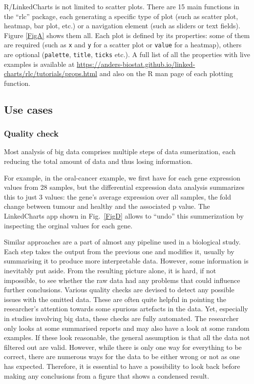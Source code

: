 \documentclass[twocolumn,10pt]{article}
\begin{document}
R/LinkedCharts is not limited to scatter plots. There are 15 main functions in the ``rlc'' package, each generating a specific type of plot (such as scatter plot, heatmap, bar plot, etc.) or a navigation element (such as sliders or text fields). Figure \ref{FigA} shows them all. Each plot is defined by its properties: some of them are required (such as \texttt{x} and \texttt{y} for a scatter plot or \texttt{value} for a heatmap), others are optional (\texttt{palette}, \texttt{title}, \texttt{ticks} etc.). A full list of all the properties with live examples is available at \url{https://anders-biostat.github.io/linked-charts/rlc/tutorials/props.html} and also on the R man page of each plotting function.

\subsection{Use cases}
\subsubsection{Quality check}

Most analysis of big data comprises multiple steps of data sumerization, each reducing the total amount of data and thus losing information.

For example, in the oral-cancer example, we first have for each gene expression values from 28 samples, but the differential expression data analysis summarizes this to just 3 values: the gene's average expression over all samples, the fold change between tumour and healthy and the associated p value. The LinkedCharts app shown in Fig.\ \ref{FigD} allows to ``undo'' this summerization by inspecting the orginal values for each gene.

Similar approaches are a part of almost any pipeline used in a biological study. Each step takes the output from the previous one and modifies it, usually by summarising it to produce more interpretable data. However, some information is inevitably put aside. From the resulting picture alone, it is hard, if not impossible, to see whether the raw data had any problems that could influence further conclusions. Various quality checks are devised to detect any possible issues with the omitted data. These are often quite helpful in pointing the researcher's attention towards some spurious artefacts in the data. Yet, especially in studies involving big data, these checks are fully automated. The researcher only looks at some summarised reports and may also have a look at some random examples. If these look reasonable, the general assumption is that all the data not filtered out are valid. However, while there is only one way for everything to be correct, there are numerous ways for the data to be either wrong or not as one has expected. Therefore, it is essential to have a possibility to look back before making any conclusions from a figure that shows a condensed result.
\end{document}
